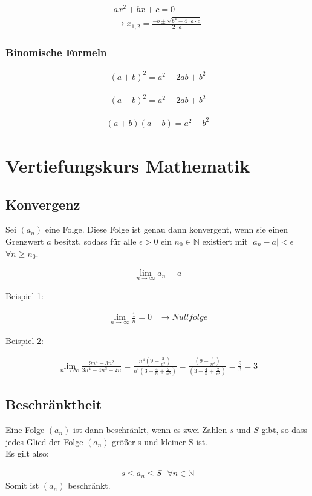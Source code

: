 \documentclass{article}
\begin{document}
\begin{align}
ax^{2} + bx + c = 0
\\
\longrightarrow x_{1,2}=\frac{-b \pm \sqrt{b^{2}-4 \cdot a \cdot c}}{2 \cdot a}
\end{align}

\subsubsection{Binomische Formeln}
\begin{align}
(a+b)^{2} = a^{2} + 2ab + b^{2}
\end{align}

\begin{align}
(a-b)^{2} = a^{2} -2ab + b^{2}
\end{align}

\begin{align}
(a+b)(a-b) = a^{2}-b^{2}
\end{align}

\newpage
\section{Vertiefungskurs Mathematik}

\subsection{Konvergenz}
Sei $(a_{n})$ eine Folge. Diese Folge ist genau dann konvergent, wenn sie einen Grenzwert $a$ besitzt, sodass für alle $\epsilon > 0$ ein $n_{0}\in\mathbb{N}$ existiert mit $|a_{n}-a|<\epsilon$ \, $\forall n\geq n_{0}$.

\begin{align}
\lim_{n \to \infty} a_{n} = a
\end{align}

Beispiel 1:

\begin{align}
\lim_{n \to \infty} \frac{1}{n} = 0 \hspace{10pt} \rightarrow Nullfolge
\end{align}

Beispiel 2:

\begin{align}
\lim_{n \to \infty} \frac{9n^{4}-3n^{2}}{3n^{4}-4n^{3}+2n} =  \frac{n^{4}(9-\frac{3}{n^{2}})}{n^{^{4}}(3-\frac{4}{n}+\frac{2}{n^{3}})} =  \frac{(9-\frac{3}{n^{2}})}{(3-\frac{4}{n}+\frac{2}{n^{3}})} = \frac{9}{3} = 3 
\end{align}

\subsection{Beschränktheit}
Eine Folge $(a_{n})$ ist dann beschränkt, wenn es zwei Zahlen $s$ und $S$ gibt, so dass jedes Glied der Folge $(a_{n})$ größer s und kleiner S ist. \\Es gilt also:

\begin{align}
s\leq a_{n} \leq S \hspace{8pt} \forall n \in \mathbb{N}
\end{align}
Somit ist $(a_{n})$ beschränkt.
\end{document}
